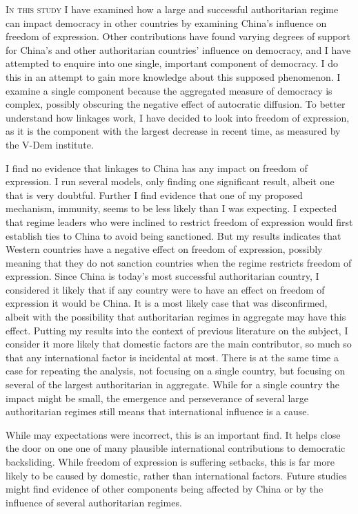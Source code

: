 \lettrine{I}{n this study} I have examined how a large and successful authoritarian regime can impact democracy in other countries by examining China's influence on freedom of expression. Other contributions have found varying degrees of support for China's and other authoritarian countries' influence on democracy, and I have attempted to enquire into one single, important component of democracy. I do this in an attempt to gain more knowledge about this supposed phenomenon. I examine a single component because the aggregated measure of democracy is complex, possibly obscuring the negative effect of autocratic diffusion. To better understand how linkages work, I have decided to look into freedom of expression, as it is the component with the largest decrease in recent time, as measured by the V-Dem institute.

I find no evidence that linkages to China has any impact on freedom of expression. I run several models, only finding one significant result, albeit one that is very doubtful. Further I find evidence that one of my proposed mechanism, immunity, seems to be less likely than I was expecting. I expected that regime leaders who were inclined to restrict freedom of expression would first establish ties to China to avoid being sanctioned. But my results indicates that Western countries have a negative effect on freedom of expression, possibly meaning that they do not sanction countries when the regime restricts freedom of expression. Since China is today's most successful authoritarian country, I considered it likely that if any country were to have an effect on freedom of expression it would be China. It is a most likely case that was disconfirmed, albeit with the possibility that authoritarian regimes in aggregate may have this effect. Putting my results into the context of previous literature on the subject, I consider it more likely that domestic factors are the main contributor, so much so that any international factor is incidental at most. There is at the same time a case for repeating the analysis, not focusing on a single country, but focusing on several of the largest authoritarian in aggregate. While for a single country the impact might be small, the emergence and perseverance of several large authoritarian regimes still means that international influence is a cause.

While may expectations were incorrect, this is an important find. It helps close the door on one one of many plausible international contributions to democratic backsliding. While freedom of expression is suffering setbacks, this is far more likely to be caused by domestic, rather than international factors. Future studies might find evidence of other components being affected by China or by the influence of several authoritarian regimes. 

